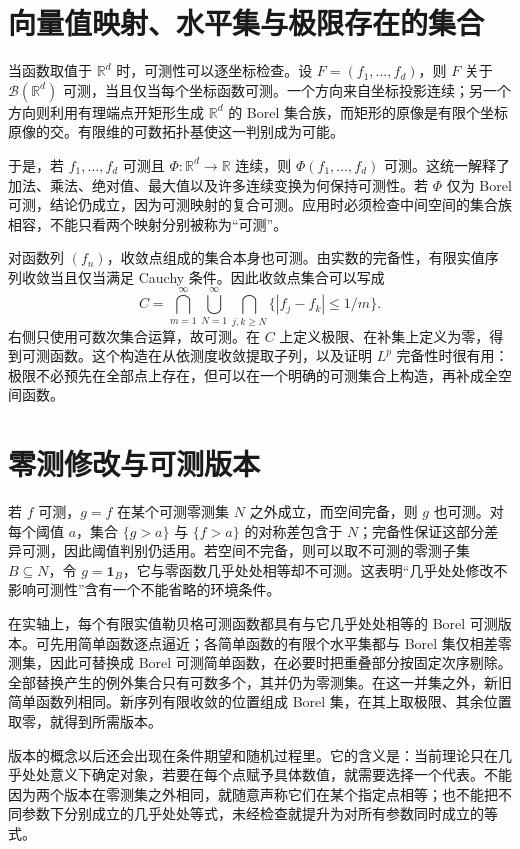 \documentclass[UTF8,12pt,a4paper,fontset=fandol]{ctexbook}
\begin{document}
\section{向量值映射、水平集与极限存在的集合}
当函数取值于 $\mathbb R^d$ 时，可测性可以逐坐标检查。设 $F=(f_1,\ldots,f_d)$，则 $F$ 关于 $\mathcal B(\mathbb R^d)$ 可测，当且仅当每个坐标函数可测。一个方向来自坐标投影连续；另一个方向则利用有理端点开矩形生成 $\mathbb R^d$ 的 Borel 集合族，而矩形的原像是有限个坐标原像的交。有限维的可数拓扑基使这一判别成为可能。

于是，若 $f_1,\ldots,f_d$ 可测且 $\Phi:\mathbb R^d\to\mathbb R$ 连续，则 $\Phi(f_1,\ldots,f_d)$ 可测。这统一解释了加法、乘法、绝对值、最大值以及许多连续变换为何保持可测性。若 $\Phi$ 仅为 Borel 可测，结论仍成立，因为可测映射的复合可测。应用时必须检查中间空间的集合族相容，不能只看两个映射分别被称为“可测”。

对函数列 $(f_n)$，收敛点组成的集合本身也可测。由实数的完备性，有限实值序列收敛当且仅当满足 Cauchy 条件。因此收敛点集合可以写成
\[
 C=\bigcap_{m=1}^{\infty}\bigcup_{N=1}^{\infty}
 \bigcap_{j,k\geq N}\{|f_j-f_k|\leq1/m\}.
\]
右侧只使用可数次集合运算，故可测。在 $C$ 上定义极限、在补集上定义为零，得到可测函数。这个构造在从依测度收敛提取子列，以及证明 $L^p$ 完备性时很有用：极限不必预先在全部点上存在，但可以在一个明确的可测集合上构造，再补成全空间函数。

\section{零测修改与可测版本}
若 $f$ 可测，$g=f$ 在某个可测零测集 $N$ 之外成立，而空间完备，则 $g$ 也可测。对每个阈值 $a$，集合 $\{g>a\}$ 与 $\{f>a\}$ 的对称差包含于 $N$；完备性保证这部分差异可测，因此阈值判别仍适用。若空间不完备，则可以取不可测的零测子集 $B\subseteq N$，令 $g=\mathbf1_B$，它与零函数几乎处处相等却不可测。这表明“几乎处处修改不影响可测性”含有一个不能省略的环境条件。

在实轴上，每个有限实值勒贝格可测函数都具有与它几乎处处相等的 Borel 可测版本。可先用简单函数逐点逼近；各简单函数的有限个水平集都与 Borel 集仅相差零测集，因此可替换成 Borel 可测简单函数，在必要时把重叠部分按固定次序剔除。全部替换产生的例外集合只有可数多个，其并仍为零测集。在这一并集之外，新旧简单函数列相同。新序列有限收敛的位置组成 Borel 集，在其上取极限、其余位置取零，就得到所需版本。

版本的概念以后还会出现在条件期望和随机过程里。它的含义是：当前理论只在几乎处处意义下确定对象，若要在每个点赋予具体数值，就需要选择一个代表。不能因为两个版本在零测集之外相同，就随意声称它们在某个指定点相等；也不能把不同参数下分别成立的几乎处处等式，未经检查就提升为对所有参数同时成立的等式。
\end{document}
